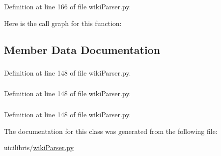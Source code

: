 \-Definition at line 166 of file wiki\-Parser.\-py.



\-Here is the call graph for this function\-:




\subsection{\-Member \-Data \-Documentation}
\hypertarget{classuicilibris_1_1wikiParser_1_1lineJoiner_a6f256454bdf66e5bc7092b2e5e35e309}{
\subsubsection[{encoding}]{}}\label{classuicilibris_1_1wikiParser_1_1lineJoiner_a6f256454bdf66e5bc7092b2e5e35e309}


\-Definition at line 148 of file wiki\-Parser.\-py.

\hypertarget{classuicilibris_1_1wikiParser_1_1lineJoiner_ac880296b5451530bdb53f9ee85f8d1ee}{
\subsubsection[{lines}]{}}\label{classuicilibris_1_1wikiParser_1_1lineJoiner_ac880296b5451530bdb53f9ee85f8d1ee}


\-Definition at line 148 of file wiki\-Parser.\-py.

\hypertarget{classuicilibris_1_1wikiParser_1_1lineJoiner_af17fcd2f320eca11d8d790d4842a4b7e}{
\subsubsection[{old\-Wiki2}]{}}\label{classuicilibris_1_1wikiParser_1_1lineJoiner_af17fcd2f320eca11d8d790d4842a4b7e}


\-Definition at line 148 of file wiki\-Parser.\-py.



\-The documentation for this class was generated from the following file\-:\begin{DoxyCompactItemize}
\item 
uicilibris/\hyperlink{wikiParser_8py}{wiki\-Parser.\-py}\end{DoxyCompactItemize}
